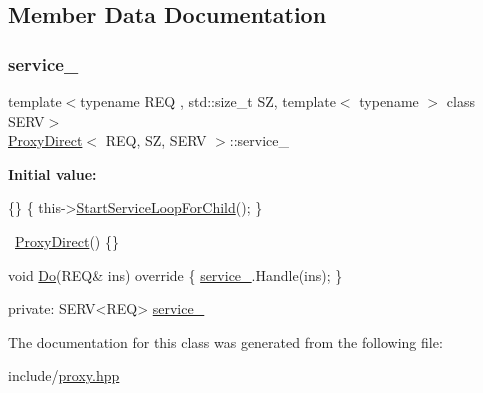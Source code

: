 \subsection{Member Data Documentation}
\mbox{\label{classProxyDirect_a2c2d9a268b533d24d49b27f999583910}} 
\subsubsection{\texorpdfstring{service\+\_\+}{service\_}}
{\footnotesize\ttfamily template$<$typename R\+EQ , std\+::size\+\_\+t SZ, template$<$ typename $>$ class S\+E\+RV$>$ \\
\hyperlink{classProxyDirect}{Proxy\+Direct}$<$ R\+EQ, SZ, S\+E\+RV $>$\+::service\+\_\+}

{\bfseries Initial value\+:}
\begin{DoxyCode}
\{\}
    \{
        this->\hyperlink{classAbstractProxy_a8e4f4208efe95831a8bdb4cf139ec0f7}{StartServiceLoopForChild}();
    \}

    ~\hyperlink{classProxyDirect}{ProxyDirect}()
    \{\}

    \textcolor{keywordtype}{void}
    \hyperlink{classAbstractProxy_ab772bf6acfc0b7f69eae6fcc4039df8d}{Do}(REQ& ins)\textcolor{keyword}{ override}
\textcolor{keyword}{    }\{
        \hyperlink{classProxyDirect_a2c2d9a268b533d24d49b27f999583910}{service\_}.Handle(ins);
    \}

\textcolor{keyword}{private}:
    SERV<REQ> \hyperlink{classProxyDirect_a2c2d9a268b533d24d49b27f999583910}{service\_}
\end{DoxyCode}


The documentation for this class was generated from the following file\+:\begin{DoxyCompactItemize}
\item 
include/\hyperlink{proxy_8hpp}{proxy.\+hpp}\end{DoxyCompactItemize}

